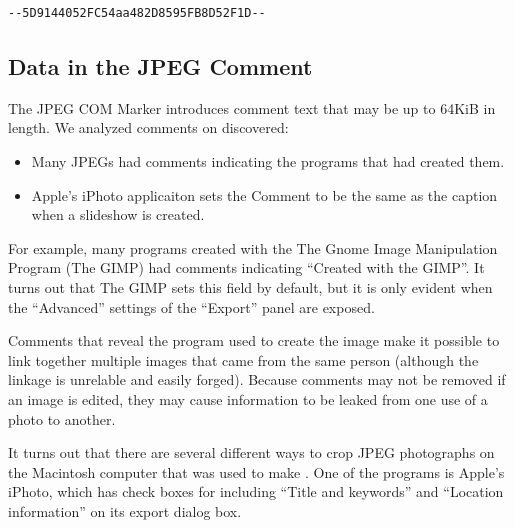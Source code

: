 \begin{lstlisting}[caption={A 40-character block of text consisting of
    two dashes, a 128-bit string (32 hexadecimal
    numbers), two more dashes, a carriage return and a line feed were
    found at the end of every photo taken with a Nokia Lumia 822
    cellular phone. Is this a serial number?},label=lumia822]
--5D9144052FC54aa482D8595FB8D52F1D--
\end{lstlisting}

\subsection{Data in the JPEG Comment}

The JPEG COM Marker introduces comment text that may be up to 64KiB in
length. We analyzed comments on discovered:

\begin{itemize}
\item Many JPEGs had comments indicating the programs that had created
  them. 
\item Apple's iPhoto applicaiton sets the Comment to be the same as
  the caption when a slideshow is created.
\end{itemize}

For example, many programs created with the The Gnome Image Manipulation
Program (The GIMP) had comments indicating ``Created with the
GIMP''. It turns out that The GIMP sets this field by default, but it
is only evident when the ``Advanced'' settings of the ``Export'' panel
are exposed.

Comments that reveal the program used to create the image make it
possible to link together multiple images that came from the same
person (although the linkage is unrelable and easily forged). Because
comments may not be removed if an image is edited, they may cause
information to be leaked from one use of a photo to another. 


It turns out that there are several different ways to crop JPEG
photographs on the Macintosh computer that was used to make
. One of the programs is Apple's iPhoto, which has
check boxes for including ``Title and keywords'' and ``Location
information'' on its export dialog box. 




